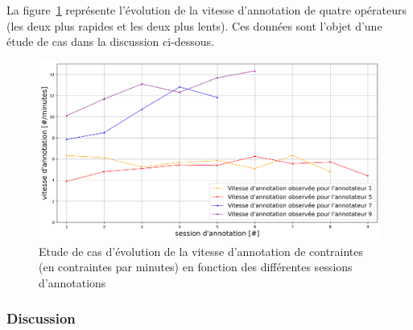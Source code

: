 			La figure~\ref{figure:4.3.1-ETUDE-COUTS-TEMPS-ANNOTATION-EXEMPLE} représente l'évolution de la vitesse d'annotation de quatre opérateurs (les deux plus rapides et les deux plus lents). Ces données sont l'objet d'une étude de cas dans la discussion ci-dessous.
			\begin{figure}[!htb]
				\centering
				\includegraphics[width=\textwidth]{figures/etude-temps-annotation-3-etude-de-cas}
				\caption{Etude de cas d'évolution de la vitesse d'annotation de contraintes (en contraintes par minutes) en fonction des différentes sessions d'annotations}
				\label{figure:4.3.1-ETUDE-COUTS-TEMPS-ANNOTATION-EXEMPLE}
			\end{figure}

		\subsubsection{Discussion}
		
